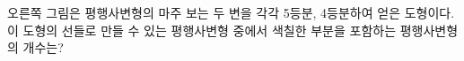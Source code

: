 \noindent\begin{minipage}[t]{0.58\linewidth}\vspace{0pt}\raggedright 오른쪽 그림은 평행사변형의 마주 보는 두 변을 각각 5등분, 4등분하여 얻은 도형이다. 이 도형의 선들로 만들 수 있는 평행사변형 중에서 색칠한 부분을 포함하는 평행사변형의 개수는?\end{minipage}\hfill\begin{minipage}[t]{0.4\linewidth}\vspace{0pt}\centering \resizebox{\ifdim\width>\linewidth\linewidth\else\width\fi}{!}{}\end{minipage}\par
{}
